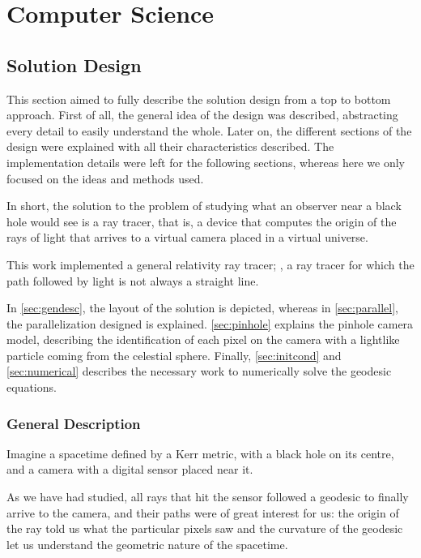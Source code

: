 \chapter{Computer Science}
\label{chapter:computer-science}

\section{Solution Design}
\label{chapter:design}

This section aimed to fully describe the solution design from a top to bottom approach. First of all, the general idea of the design was described, abstracting every detail to easily understand the whole. Later on, the different sections of the design were explained with all their characteristics described. The implementation details were left for the following sections, whereas here we only focused on the ideas and methods used.

In short, the solution to the problem of studying what an observer near a black hole would see is a ray tracer, that is, a device that computes the origin of the rays of light that arrives to a virtual camera placed in a virtual universe.

This work implemented a general relativity ray tracer; \ie, a ray tracer for which the path followed by light is not always a straight line.

In \autoref{sec:gendesc}, the layout of the solution is depicted, whereas in \autoref{sec:parallel}, the parallelization designed is explained. \autoref{sec:pinhole} explains the pinhole camera model, describing the identification of each pixel on the camera with a lightlike particle coming from the celestial sphere. Finally, \autoref{sec:initcond} and \autoref{sec:numerical} describes the necessary work to numerically solve the geodesic equations.

\subsection{General Description}
\label{sec:gendesc}

Imagine a spacetime defined by a Kerr metric, with a black hole on its centre, and a camera with a digital sensor placed near it.

As we have had studied, all rays that hit the sensor followed a geodesic to finally arrive to the camera, and their paths were of great interest for us: the origin of the ray told us what the particular pixels saw and the curvature of the geodesic let us understand the geometric nature of the spacetime.

